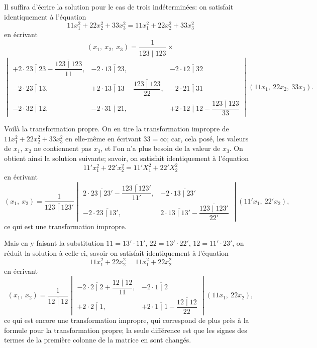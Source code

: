 \documentclass[12pt,a4paper]{article}
\begin{document}
Il suffira d'\'{e}crire la solution pour le cas de trois ind\'{e}termin\'{e}es: on satisfait identiquement \`{a} l'\'{e}quation
\[
11 x_1^2 + 22 x_2^2 + 33 x_3^2 = 11 x_1^2 + 22 x_2^2 + 33 x_3^2
\]
en \'{e}crivant
\[
(x_1,\ x_2,\ x_3) = \frac{1}{\overline{123 \mid 123}} \times
\]
\[
\begin{vmatrix}
+2 \cdot \overline{23 \mid 23} - \dfrac{\overline{123 \mid 123}}{11}, &
-2 \cdot \overline{13 \mid 23}, &
-2 \cdot \overline{12 \mid 32} \\[1.5em]
-2 \cdot \overline{23 \mid 13}, &
+2 \cdot \overline{13 \mid 13} - \dfrac{\overline{123 \mid 123}}{22}, &
-2 \cdot \overline{21 \mid 31} \\[1.5em]
-2 \cdot \overline{32 \mid 12}, &
-2 \cdot \overline{31 \mid 21}, &
+2 \cdot \overline{12 \mid 12} - \dfrac{\overline{123 \mid 123}}{33}
\end{vmatrix}
(11x_1,\ 22x_2,\ 33x_3).
\]

\newpage
\setcounter{page}{210}

Voil\`{a} la transformation propre. On en tire la transformation impropre de $11x_1^2 + 22x_2^2 + 33x_3^2$ en elle-m\^{e}me en \'{e}crivant $33 = \infty$; car, cela pos\'{e}, les valeurs de $x_1$, $x_2$ ne contiennent pas $x_3$, et l'on n'a plus besoin de la valeur de $x_3$. On obtient ainsi la solution suivante; savoir, on satisfait identiquement \`{a} l'\'{e}quation
\[
11' x_1^2 + 22' x_2^2 = 11' X_1^2 + 22' X_2^2
\]
en \'{e}crivant
\[
(x_1,\ x_2) =
\frac{1}{\overline{123 \mid 123'}}
\begin{vmatrix}
2 \cdot \overline{23 \mid 23'} - \dfrac{\overline{123 \mid 123'}}{11'}, &
-2 \cdot \overline{13 \mid 23'} \\[1em]
-2 \cdot \overline{23 \mid 13'}, &
2 \cdot \overline{13 \mid 13'} - \dfrac{\overline{123 \mid 123'}}{22'}
\end{vmatrix}
(11' x_1,\ 22' x_2),
\]
ce qui est une transformation impropre.

Mais en y faisant la substitution $11 = 13' \cdot 11'$, $22 = 13' \cdot 22'$, $12 = 11' \cdot 23'$, on r\'{e}duit la solution \`{a} celle-ci, savoir on satisfait identiquement \`{a} l'\'{e}quation
\[
11 x_1^2 + 22 x_2^2 = 11 x_1^2 + 22 x_2^2
\]
en \'{e}crivant
\[
(x_1,\ x_2) =
\frac{1}{\overline{12 \mid 12}}
\begin{vmatrix}
-2 \cdot \overline{2 \mid 2} + \dfrac{\overline{12 \mid 12}}{11}, &
-2 \cdot \overline{1 \mid 2} \\[1em]
+2 \cdot \overline{2 \mid 1}, &
+2 \cdot \overline{1 \mid 1} - \dfrac{\overline{12 \mid 12}}{22}
\end{vmatrix}
(11 x_1,\ 22 x_2),
\]
ce qui est encore une transformation impropre, qui correspond de plus pr\`{e}s \`{a} la formule pour la transformation propre; la seule diff\'{e}rence est que les signes des termes de la premi\`{e}re colonne de la matrice en sont chang\'{e}s.
\end{document}
